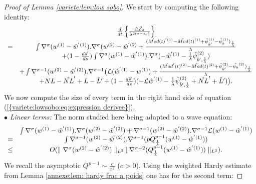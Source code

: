 \documentclass[11pt,a4paper,reqno]{amsart}
\theoremstyle{remark}
\numberwithin{equation}{section}
\begin{document}
\begin{proof}[Proof of Lemma \ref{variete:lem:low sobo}]
We start by computing the following identity:
\begin{equation} \label{variete:lowsobo:eq:expression derivee}
\begin{array}{r c l}
&\frac{d}{dt}\left\{ \frac{\triangle \hat{\mathcal{E}}_{\sigma}}{\lambda^{2(\sigma-s_c)}} \right\} \\
=& \int \nabla^{\sigma}(w^{(1)}-\hat{w}^{'(1)}).\nabla^{\sigma}(w^{(2)}-\hat{w}^{'(2)}+\frac{(\hat{Mod}(t)^{'(1)}-\tilde{Mod}(t)^{(1)}+\tilde{\psi}_{\hat{b}'}^{(1)}-\tilde{\psi}_b^{(1)})_{\frac{1}{\lambda}}}{\lambda} \\
&+ (1-\frac{d\hat{s}'}{ds})\int \nabla^{\sigma}(w^{(1)}-\hat{w}^{'(1)}).\nabla^{\sigma}(-\hat{w}^{'(1)}-\frac{1}{\lambda}\tilde{\psi}_{\hat{b}',\frac{1}{\lambda}}^{(2)}) \\
& + \int \nabla^{\sigma-1}(w^{(2)}-\hat{w}^{'(2)}).\nabla^{\sigma-1}\bigl{(}\mathcal{L}(\hat{w}^{'(1)}-w^{(1)})+\frac{(\hat{Mod}'(t)^{(2)}-\tilde{Mod}(t)^{(2)}+\tilde{\psi}_{\hat{b}'}^{(2)}-\tilde{\psi_b}^{(2)})_{\frac{1}{\lambda}}}{\lambda}\\
&+NL-\hat{NL}'+L-\hat{L}'+(1-\frac{d\hat{s}'}{ds})(-\mathcal{L}\hat{w}^{'(1)}-\frac{1}{\lambda}\tilde{\psi}_{\hat{b}',\frac{1}{\lambda}}^{(2)}+\hat{NL}'+\hat{L}') \bigr{)}.
\end{array}
\end{equation}
We now compute the size of every term in the right hand side of equation {{\rm (\ref{{variete:lowsobo:eq:expression derivee}})}}.\\
$\bullet$ \emph{Linear terms:} The norm studied here being adapted to a wave equation:
$$
\begin{array}{r c l}
& \int \nabla^{\sigma}(w^{(1)}-\hat{w}^{'(1)}).\nabla^{\sigma}(w^{(2)}-\hat{w}^{'(2)})+ \nabla^{\sigma-1}(w^{(2)}-\hat{w}^{'(2)}).\nabla^{\sigma-1}\mathcal{L} (w^{(1)}-\hat{w}^{'(1)})  \\
=& \int \nabla^{\sigma-1}(w^{(2)}-\hat{w}^{'(2)}). \nabla^{\sigma-1}(pQ_{\frac{1}{\lambda}}^{p-1}(w^{(1)}-\hat{w}^{'(1)})) \\
\leq & O( \parallel \nabla^{\sigma}(w^{(2)}-\hat{w}^{'(2)}) \parallel_{L^2} \parallel \nabla^{\sigma-2}(Q_{\frac{1}{\lambda}}^{p-1}(w^{(1)}-\hat{w}^{'(1)})) \parallel_{L^2}) .
\end{array}
$$
We recall the asymptotic $Q^{p-1}\sim\frac{c}{x^{2}}$ ($c>0$). Using the weighted Hardy estimate from Lemma \ref{annexe:lem: hardy frac a poids} one has for the second term:

\end{proof}
\end{document}

